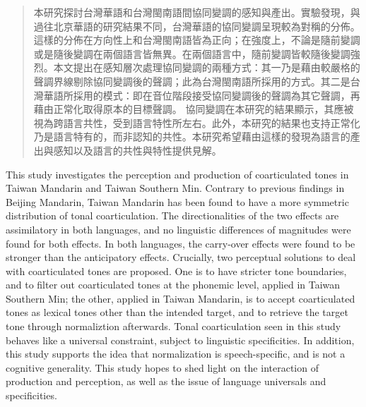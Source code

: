 
\begin{abstract}

本研究探討台灣華語和台灣閩南語間協同變調的感知與產出。實驗發現，與過往北京華語的研究結果不同，台灣華語的協同變調呈現較為對稱的分佈。這樣的分佈在方向性上和台灣閩南語皆為正向；在強度上，不論是隨前變調或是隨後變調在兩個語言皆無異。在兩個語言中，隨前變調皆較隨後變調強烈。本文提出在感知層次處理協同變調的兩種方式：其一乃是藉由較嚴格的聲調界線剔除協同變調後的聲調；此為台灣閩南語所採用的方式。其二是台灣華語所採用的模式：即在音位階段接受協同變調後的聲調為其它聲調，再藉由正常化取得原本的目標聲調。
協同變調在本研究的結果顯示，其應被視為跨語言共性，受到語言特性所左右。此外，本研究的結果也支持正常化乃是語言特有的，而非認知的共性。本研究希望藉由這樣的發現為語言的產出與感知以及語言的共性與特性提供見解。

\end{abstract}

\begin{abstract*}

This study investigates the perception and production of coarticulated tones in Taiwan Mandarin and Taiwan Southern Min. Contrary to previous findings in Beijing Mandarin, Taiwan Mandarin has been found to have a more symmetric distribution of tonal coarticulation. The directionalities of the two effects are assimilatory in both languages, and no linguistic differences of magnitudes were found for both effects. In both languages, the carry-over effects were found to be stronger than the anticipatory effects. Crucially, two perceptual solutions to deal with coarticulated tones are proposed. One is to have 
stricter tone boundaries, and to filter out coarticulated tones at the phonemic level, applied in Taiwan Southern Min; the other, applied in Taiwan Mandarin, is to accept coarticulated tones as lexical tones other than the intended target, and to retrieve the target tone through normaliztion afterwards. Tonal coarticulation seen in this study behaves like a universal constraint, subject to linguistic specificities. In addition, this study supports the idea that normalization is speech-specific, and is not a cognitive generality. This study hopes to shed light on the interaction of production and perception, as well as the issue of language universals and specificities.

\end{abstract*}
